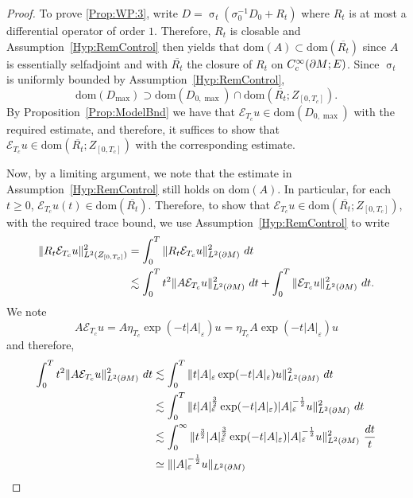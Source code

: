 \documentclass[a4paper,10pt,reqno]{amsart}
\newcommand{\sym}{\upsigma}
\newcommand{\modulus}[1]{|#1|}
\newcommand{\norm}[1]{\| #1 \|}%
\newcommand{\Lp}[2][{}]{{\rm L}^{#2}_{\rm #1}}%
\newcommand{\Ck}[2][{}]{{\rm C}^{#2}_{\rm #1}}%
\newcommand{\dom}{\mathrm{dom}}
\newcommand{\close}[1]{\overline{#1}}
\newcommand{\ext}{\mathcal{E}}
\renewcommand{\epsilon}{\varepsilon}
\newcommand{\dM}{\partial M}
\theoremstyle{definition}
\begin{document}
\begin{proof}
To prove \ref{Prop:WP:3}, write $D = \sym_t( \sigma_0^{-1} D_0 + R_t)$ where  $R_t$ is at most a differential operator of order $1$.
Therefore, $R_t$ is closable and Assumption~\ref{Hyp:RemControl} then yields that $\dom(A) \subset \dom(\close{R_t})$ since $A$ is essentially selfadjoint and with  $\close{R_t}$ the closure of $R_t$ on $\Ck[c]{\infty}(\dM;E)$.
Since $\sym_t$ is uniformly bounded by Assumption~\ref{Hyp:RemControl},
$$\dom(D_{\max}) \supset \dom(D_{0,\max}) \cap \dom(\close{R_t}; Z_{[0,T_c]}).$$
By Proposition~\ref{Prop:ModelBnd} we have that $\ext_{T_c}u \in \dom(D_{0,\max})$ with the required estimate, and therefore, it suffices to show that $\ext_{T_c}u \in \dom(\close{R_t}; Z_{[0,T_c]})$ with the corresponding estimate.

Now, by a limiting argument, we note that the estimate in Assumption~\ref{Hyp:RemControl} still holds on $\dom(A)$.
In particular, for each $t \geq 0$, $\ext_{T_{c}}u(t) \in \dom(\close{R_t})$.
Therefore, to show that $\ext_{T_c} u \in \dom(\close{R_t}; Z_{[0,T_c]})$, with the required trace bound, we use Assumption~\ref{Hyp:RemControl} to write
\begin{align*}
\norm{R_t \ext_{T_c} u}_{\Lp{2}(Z_{[0,T_c]})}^2
 & = \int_{0}^T  \norm{R_t \ext_{T_c} u}_{\Lp{2}(\dM)}^2\ dt                                                               \\
 & \lesssim  \int_{0}^T t^2 \norm{A\ext_{T_c} u}^2_{\Lp{2}(\dM)}\ dt + \int_{0}^T \norm{\ext_{T_c} u}_{\Lp{2}(\dM)}^2\ dt.
\end{align*}
We note
$$A \ext_{T_c}u = A  \eta_{T_c} \exp(-t\modulus{A}_{\epsilon}) u =  \eta_{T_c} A \exp(-t\modulus{A}_{\epsilon}) u$$
and therefore,
\begin{align*}
\int_{0}^T t^2 \norm{A\ext_{T_c} u}^2_{\Lp{2}(\dM)}\ dt
 & \lesssim \int_{0}^T  \norm{t \modulus{A}_{\epsilon} \exp(-t\modulus{A}_\epsilon) u}^2_{\Lp{2}(\dM)}\ dt                                                                         \\
 & \lesssim \int_{0}^T  \norm{t \modulus{A}_{\epsilon}^{\frac32}  \exp(-t\modulus{A}_\epsilon)  \modulus{A}_{\epsilon}^{- \frac12} u}^2_{\Lp{2}(\dM)}\ dt                          \\
 & \lesssim \int_{0}^\infty  \norm{t^{\frac32} \modulus{A}_{\epsilon}^{\frac32}  \exp(-t\modulus{A}_\epsilon)  \modulus{A}_{\epsilon}^{- \frac12} u}^2_{\Lp{2}(\dM)}\ \frac{dt}{t} \\
 & \simeq \norm{\modulus{A}_{\epsilon}^{-\frac12} u}_{\Lp{2}(\dM)}                                                                                                                 \\

\end{align*}
\end{proof}
\end{document}
